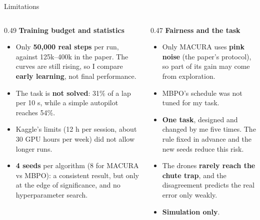 \documentclass[aspectratio=169,10pt]{beamer}
\begin{document}
\begin{frame}{Limitations}
  \begin{columns}[T]
    \begin{column}{0.49\textwidth}
      \textbf{Training budget and statistics}
      \begin{itemize}\small
        \item Only \textbf{50,000 real steps} per run, against 125k--400k in the paper. The curves are still
              rising, so I compare \textbf{early learning}, not final performance.
        \item The task is \textbf{not solved}: 31\% of a lap per 10 s, while a simple autopilot reaches 54\%.
        \item Kaggle's limits (12 h per session, about 30 GPU hours per week) did not allow longer runs.
        \item \textbf{4 seeds} per algorithm (8 for MACURA vs MBPO): a consistent result, but only at the edge of
              significance, and no hyperparameter search.
      \end{itemize}
    \end{column}
    \begin{column}{0.47\textwidth}
      \textbf{Fairness and the task}
      \begin{itemize}\small
        \item Only MACURA uses \textbf{pink noise} (the paper's protocol), so part of its gain may come from
              exploration.
        \item MBPO's schedule was not tuned for my task.
        \item \textbf{One task}, designed and changed by me five times. The rule fixed in advance and the new seeds
              reduce this risk.
        \item The drones \textbf{rarely reach the chute trap}, and the disagreement predicts the real error only
              weakly.
        \item \textbf{Simulation only}.
      \end{itemize}
    \end{column}
  \end{columns}
\end{frame}
\end{document}
